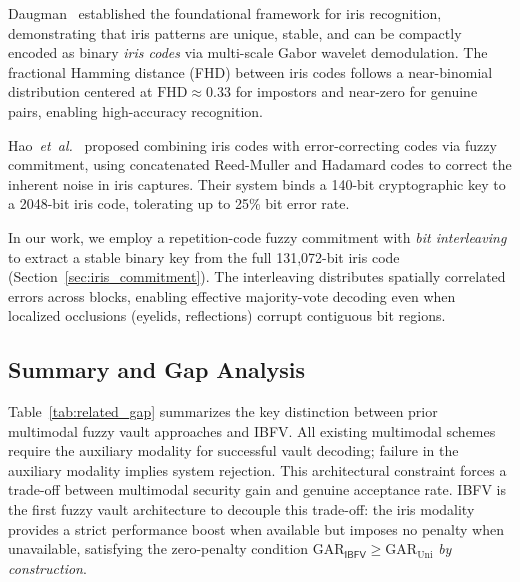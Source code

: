 \documentclass[3p,twocolumn]{elsarticle}
\newcommand{\IBFV}{\textsf{IBFV}}
\newcommand{\GAR}{\mathrm{GAR}}
\newcommand{\FHD}{\mathrm{FHD}}
\begin{document}
Daugman~\cite{daugman2004how} established the foundational framework for iris recognition, demonstrating that iris patterns are unique, stable, and can be compactly encoded as binary \emph{iris codes} via multi-scale Gabor wavelet demodulation. The fractional Hamming distance (FHD) between iris codes follows a near-binomial distribution centered at $\FHD \approx 0.33$ for impostors and near-zero for genuine pairs, enabling high-accuracy recognition.

Hao~\textit{et~al.}~\cite{hao2006combining} proposed combining iris codes with error-correcting codes via fuzzy commitment, using concatenated Reed-Muller and Hadamard codes to correct the inherent noise in iris captures. Their system binds a 140-bit cryptographic key to a 2048-bit iris code, tolerating up to 25\% bit error rate. 

In our work, we employ a repetition-code fuzzy commitment with \emph{bit interleaving} to extract a stable binary key from the full 131,072-bit iris code (Section~\ref{sec:iris_commitment}). The interleaving distributes spatially correlated errors across blocks, enabling effective majority-vote decoding even when localized occlusions (eyelids, reflections) corrupt contiguous bit regions.

\subsection{Summary and Gap Analysis}

Table~\ref{tab:related_gap} summarizes the key distinction between prior multimodal fuzzy vault approaches and \IBFV{}. All existing multimodal schemes~\cite{nandakumar2008multibiometric,moon2010multibiometric} require the auxiliary modality for successful vault decoding; failure in the auxiliary modality implies system rejection. This architectural constraint forces a trade-off between multimodal security gain and genuine acceptance rate. \IBFV{} is the first fuzzy vault architecture to decouple this trade-off: the iris modality provides a strict performance boost when available but imposes no penalty when unavailable, satisfying the zero-penalty condition $\GAR_{\IBFV} \geq \GAR_{\text{Uni}}$ \emph{by construction}.
\end{document}
